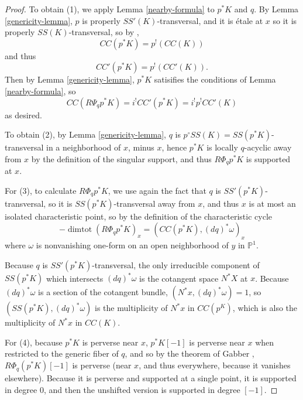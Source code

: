 \begin{proof} To obtain (1), we apply Lemma \ref{nearby-formula} to $p^* K$ and $q$. By Lemma \ref{genericity-lemma}, $p$ is properly $SS'(K)$-transversal, and it is \'{e}tale at $x$ so it is properly $SS(K)$-transversal, so by \cite[Theorem 6.6]{saito1}, \[CC(p^* K) = p^!(CC(K))\] and thus \[CC'(p^* K) = p^!(CC'(K)).\] Then by Lemma \ref{genericity-lemma}, $p^* K$ satisifies the conditions of Lemma \ref{nearby-formula}, so \[ CC ( R \Psi_{q} p^*K) = i^! CC'(p^* K) = i^! p^! CC'(K) \] as desired.

To obtain (2), by Lemma \ref{genericity-lemma}, $q $ is $ p^\circ SS(K)= SS(p^* K)$-transversal in a neighborhood of $x$, minus $x$, hence  $p^* K$ is locally $q$-acyclic away from $x$  by the definition of the singular support,  and thus $R \Phi_q p^* K$ is supported at $x$.



For (3), to calculate $R \Phi_q p^*K $, we use again the fact that $q $ is $ SS'(p^* K)$-transversal, so it is $SS(p^*K)$-transversal away from $x$, and thus $x$ is at most an isolated characteristic point, so by the definition of the characteristic cycle \[ -\operatorname{dimtot} (R \Phi_q p^* K)_x = (CC (p^* K), (dq)^* \omega)_x\] where $\omega$ is nonvanishing one-form on an open neighborhood of $y$ in $\mathbb P^1$.

Because $q$ is $SS'(p^*K)$-transversal, the only irreducible component of $SS(p^*K)$ which intersects $(dq)^* \omega $ is the cotangent space $N^* X$ at $x$. Because $(dq)^* \omega$ is a section of the cotangent bundle, $(N^*x, (dq)^* \omega)= 1$, so $(SS(p^*K), (dq)^* \omega)$ is the multiplicity of $N^*x$ in $CC(p^K)$, which is also the multiplicity of $N^* x$ in $CC(K)$.

For (4), because $p^*K$ is perverse near $x$, $p^* K[-1]$ is perverse near $x$ when restricted to the generic fiber of $q$, and so by the theorem of Gabber \cite[Corollary 4.6]{Illusie}, $R\Phi_q ( p^* K)[-1]$ is perverse (near $x$, and thus everywhere, because it vanishes elsewhere). Because it is perverse and supported at a single point, it is supported in degree $0$, and then the unshifted version is supported in degree $[-1]$.

\end{proof}




